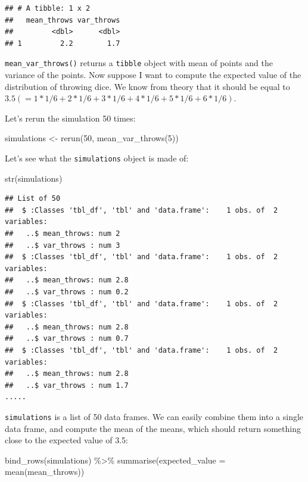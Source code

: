 \documentclass[
]{article}
\newenvironment{Shaded}{\begin{snugshade}}{\end{snugshade}}
\newcommand{\AttributeTok}[1]{\textcolor[rgb]{0.77,0.63,0.00}{#1}}
\newcommand{\DecValTok}[1]{\textcolor[rgb]{0.00,0.00,0.81}{#1}}
\newcommand{\FunctionTok}[1]{\textcolor[rgb]{0.00,0.00,0.00}{#1}}
\newcommand{\NormalTok}[1]{#1}
\newcommand{\OtherTok}[1]{\textcolor[rgb]{0.56,0.35,0.01}{#1}}
\newcommand{\SpecialCharTok}[1]{\textcolor[rgb]{0.00,0.00,0.00}{#1}}
\begin{document}
\begin{verbatim}
## # A tibble: 1 x 2
##   mean_throws var_throws
##         <dbl>      <dbl>
## 1         2.2        1.7
\end{verbatim}

\texttt{mean\_var\_throws()} returns a \texttt{tibble} object with mean of points and the variance of the points. Now suppose
I want to compute the expected value of the distribution of throwing dice. We know from theory that it should
be equal to \(3.5 (= 1*1/6 + 2*1/6 + 3*1/6 + 4*1/6 + 5*1/6 + 6*1/6)\).

Let's rerun the simulation 50 times:

\begin{Shaded}
\begin{Highlighting}[]
\NormalTok{simulations }\OtherTok{\textless{}{-}} \FunctionTok{rerun}\NormalTok{(}\DecValTok{50}\NormalTok{, }\FunctionTok{mean\_var\_throws}\NormalTok{(}\DecValTok{5}\NormalTok{))}
\end{Highlighting}
\end{Shaded}

Let's see what the \texttt{simulations} object is made of:

\begin{Shaded}
\begin{Highlighting}[]
\FunctionTok{str}\NormalTok{(simulations)}
\end{Highlighting}
\end{Shaded}

\begin{verbatim}
## List of 50
##  $ :Classes 'tbl_df', 'tbl' and 'data.frame':    1 obs. of  2 variables:
##   ..$ mean_throws: num 2
##   ..$ var_throws : num 3
##  $ :Classes 'tbl_df', 'tbl' and 'data.frame':    1 obs. of  2 variables:
##   ..$ mean_throws: num 2.8
##   ..$ var_throws : num 0.2
##  $ :Classes 'tbl_df', 'tbl' and 'data.frame':    1 obs. of  2 variables:
##   ..$ mean_throws: num 2.8
##   ..$ var_throws : num 0.7
##  $ :Classes 'tbl_df', 'tbl' and 'data.frame':    1 obs. of  2 variables:
##   ..$ mean_throws: num 2.8
##   ..$ var_throws : num 1.7
.....
\end{verbatim}

\texttt{simulations} is a list of 50 data frames. We can easily combine them into a single data frame, and compute the
mean of the means, which should return something close to the expected value of 3.5:

\begin{Shaded}
\begin{Highlighting}[]
\FunctionTok{bind\_rows}\NormalTok{(simulations) }\SpecialCharTok{\%\textgreater{}\%}
  \FunctionTok{summarise}\NormalTok{(}\AttributeTok{expected\_value =} \FunctionTok{mean}\NormalTok{(mean\_throws))}
\end{Highlighting}
\end{Shaded}
\end{document}
